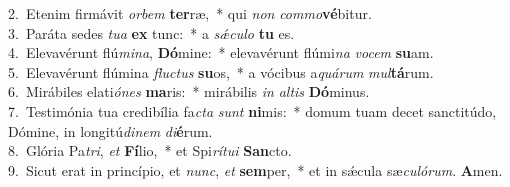 {2.~}Etenim firmávit \textit{or}\textit{bem} \textbf{ter}ræ,~* qui \textit{non} \textit{com}\textit{mo}\textbf{vé}bitur.\\
{3.~}Paráta sedes \textit{tu}\textit{a} \textbf{ex} tunc:~* a \textit{sǽ}\textit{cu}\textit{lo} \textbf{tu} es.\\
{4.~}Elevavérunt flú\textit{mi}\textit{na}, \textbf{Dó}mine:~* elevavérunt flúmi\textit{na} \textit{vo}\textit{cem} \textbf{su}am.\\
{5.~}Elevavérunt flúmina \textit{flu}\textit{ctus} \textbf{su}os,~* a vócibus a\textit{quá}\textit{rum} \textit{mul}\textbf{tá}rum.\\
{6.~}Mirábiles elati\textit{ó}\textit{nes} \textbf{ma}ris:~* mirábilis \textit{in} \textit{al}\textit{tis} \textbf{Dó}minus.\\
{7.~}Testimónia tua credibília fa\textit{cta} \textit{sunt} \textbf{ni}mis:~* domum tuam decet sanctitúdo, Dómine, in longitú\textit{di}\textit{nem} \textit{di}\textbf{é}rum.\\
{8.~}Glória Pa\textit{tri}, \textit{et} \textbf{Fí}lio,~* et Spi\textit{rí}\textit{tu}\textit{i} \textbf{San}cto.\\
{9.~}Sicut erat in princípio, et \textit{nunc}, \textit{et} \textbf{sem}per,~* et in sǽcula sæ\textit{cu}\textit{ló}\textit{rum}. \textbf{A}men.\\
